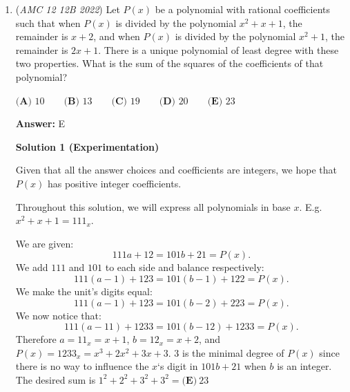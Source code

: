 \begin{enumerate}
 
 \[-\frac{m\sqrt{3}}{m+\sqrt{3}}=\frac{4m\sqrt{3}}{m-\sqrt{3}}\] 
 \[-\sqrt{3}m^2+3m=4\sqrt{3}m^2+12m\] 
 \[5\sqrt{3}m^2+9m=0\] 
 \[m(5m\sqrt{3}+9)=0\] 

 Since \(m\neq0\), we have  

 
 \[m=-\frac{3\sqrt{3}}{5}.\] 

 Now find \(B\):  

 
 \[-x\sqrt{3}+\sqrt{3}=-\frac{3\sqrt{3}}{5}x+\frac{6\sqrt{3}}{5}\] 
 \[\frac{-2\sqrt{3}}{5}x=\frac{\sqrt{3}}{5}\] 
 \[x_B=-\frac{1}{2}\] 

 Plug this into \(BE\) to get  

 
 \[y_B=\frac{3\sqrt{3}}{2}.\] 

 Since we’re asked to find \(\cos\angle C\), extend \(\overline{AC}\) to \(F\) where \(F=(-\frac{1}{2},0)\), forming right triangle \(\triangle BFC\). Using the Pythagorean theorem for \(\overline{BC}\):  

 
 \[\left(\frac{5}{2}\right)^2+\left(\frac{3\sqrt{3}}{2}\right)^2=BC^2,\quad BC=\sqrt{13}.\] 

 Thus  

 
 \[\cos\angle C=\frac{\frac{5}{2}}{\sqrt{13}}=\frac{5\sqrt{13}}{26}.\] 

 The problem asks for \(m+n+p\), so \(5+13+26=\boxed{44}\). 

 


	\item (\textit{AMC 12 12B 2022}) Let $P(x)$ be a polynomial with rational coefficients such that when $P(x)$ is divided by the polynomial $x^2 + x + 1$, the remainder is $x + 2$, and when $P(x)$ is divided by the polynomial $x^2 + 1$, the remainder is $2x + 1$. There is a unique polynomial of least degree with these two properties. What is the sum of the squares of the coefficients of that polynomial?


 $\textbf{(A) } 10 \qquad \textbf{(B) } 13 \qquad \textbf{(C) } 19 \qquad \textbf{(D) } 20 \qquad \textbf{(E) } 23$

 \textbf{Answer: }E



\textbf{Solution 1 (Experimentation)}

Given that all the answer choices and coefficients are integers, we hope that $P(x)$ has positive integer coefficients.

 Throughout this solution, we will express all polynomials in base $x$. E.g. $x^2 + x + 1 = 111_{x}$.

 We are given:
 \[111a + 12 = 101b + 21 = P(x).\]We add $111$ and $101$ to each side and balance respectively:
 \[111(a - 1) + 123 = 101(b - 1) + 122 = P(x).\]We make the unit's digits equal:
 \[111(a - 1) + 123 = 101(b - 2) + 223 = P(x).\]We now notice that:
 \[111(a - 11) + 1233 = 101(b - 12) + 1233 = P(x).\]Therefore $a = 11_{x} = x + 1$, $b = 12_{x} = x + 2$, and $P(x) = 1233_{x} = x^3 + 2x^2 + 3x + 3$. $3$ is the minimal degree of $P(x)$ since there is no way to influence the $x$‘s digit in $101b + 21$ when $b$ is an integer. The desired sum is $1^2 + 2^2 +3^2+ 3^2 = \boxed{\textbf{(E)} \ 23}$


\end{enumerate}
